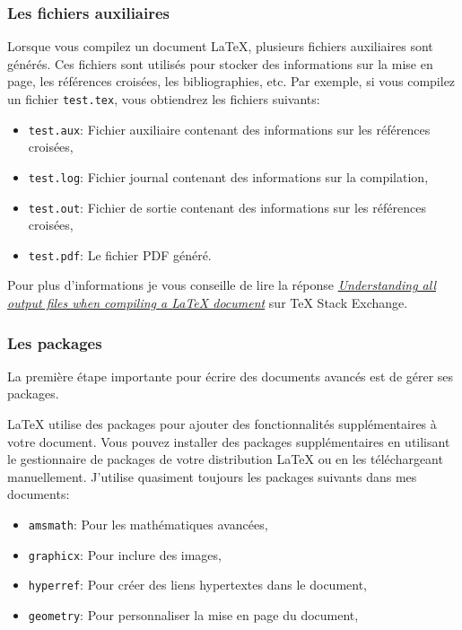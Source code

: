 \subsubsection{Les fichiers auxiliaires}\label{subsubsec:auxiliary_files}
Lorsque vous compilez un document LaTeX, plusieurs fichiers auxiliaires sont générés.
Ces fichiers sont utilisés pour stocker des informations sur la mise en page, les références croisées, les bibliographies, etc.
Par exemple, si vous compilez un fichier \texttt{test.tex}, vous obtiendrez les fichiers suivants:
\begin{itemize}
    \item \texttt{test.aux}: Fichier auxiliaire contenant des informations sur les références croisées,
    \item \texttt{test.log}: Fichier journal contenant des informations sur la compilation,
    \item \texttt{test.out}: Fichier de sortie contenant des informations sur les références croisées,
    \item \texttt{test.pdf}: Le fichier PDF généré.
\end{itemize}

Pour plus d'informations je vous conseille de lire la réponse
\href{https://tex.stackexchange.com/questions/597675/understanding-all-output-files-when-compiling-a-latex-document}{\textit{Understanding all output files when compiling a LaTeX document}} sur TeX Stack Exchange.

\subsubsection{Les packages}\label{subsubsec:package_management}

La première étape importante pour écrire des documents avancés est de gérer ses packages.

LaTeX utilise des packages pour ajouter des fonctionnalités supplémentaires à votre document.
Vous pouvez installer des packages supplémentaires en utilisant le gestionnaire de packages de votre distribution LaTeX
ou en les téléchargeant manuellement. J'utilise quasiment
toujours les packages suivants dans mes documents:
\begin{itemize}
    \item \texttt{amsmath}: Pour les mathématiques avancées,
    \item \texttt{graphicx}: Pour inclure des images,
    \item \texttt{hyperref}: Pour créer des liens hypertextes dans le document,
    \item \texttt{geometry}: Pour personnaliser la mise en page du document,
\end{itemize}

